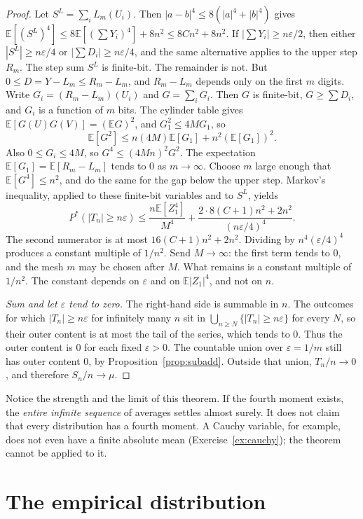 \begin{proof}
Let $S^L=\sum_i L_m(U_i)$. Then $|a-b|^4\le8(|a|^4+|b|^4)$ gives $\mathbb E[(S^L)^4]\le8\mathbb E[(\sum Y_i)^4]+8n^2\le8Cn^2+8n^2$. If $|\sum Y_i|\ge n\varepsilon/2$, then either $|S^L|\ge n\varepsilon/4$ or $|\sum D_i|\ge n\varepsilon/4$, and the same alternative applies to the upper step $R_m$. The step sum $S^L$ is finite-bit. The remainder is not. But $0\le D=Y-L_m\le R_m-L_m$, and $R_m-L_m$ depends only on the first $m$ digits. Write $G_i=(R_m-L_m)(U_i)$ and $G=\sum_i G_i$. Then $G$ is finite-bit, $G\ge\sum D_i$, and $G_i$ is a function of $m$ bits. The cylinder table gives $\mathbb E[G(U)G(V)]=(\mathbb E G)^2$, and $G_1^2\le 4M G_1$, so
\[
 \mathbb E[G^2]
 \le n(4M)\mathbb E[G_1]+n^2(\mathbb E[G_1])^2.
\]
Also $0\le G_i\le4M$, so $G^4\le(4Mn)^2 G^2$. The expectation $\mathbb E[G_1]=\mathbb E[R_m-L_m]$ tends to $0$ as $m\to\infty$. Choose $m$ large enough that $\mathbb E[G^4]\le n^2$, and do the same for the gap below the upper step. Markov's inequality, applied to these finite-bit variables and to $S^L$, yields
\[
 P^*(|T_n|\ge n\varepsilon)
 \le\frac{n\mathbb E[Z_1^4]}{M^4}
 +\frac{2\cdot8(C+1)n^2+2n^2}{(n\varepsilon/4)^4}.
\]
The second numerator is at most $16(C+1)n^2+2n^2$. Dividing by $n^4(\varepsilon/4)^4$ produces a constant multiple of $1/n^2$. Send $M\to\infty$: the first term tends to $0$, and the mesh $m$ may be chosen after $M$. What remains is a constant multiple of $1/n^2$. The constant depends on $\varepsilon$ and on $\mathbb E|Z_1|^4$, and not on $n$.

\emph{Sum and let $\varepsilon$ tend to zero.} The right-hand side is summable in $n$. The outcomes for which $|T_n|\ge n\varepsilon$ for infinitely many $n$ sit in $\bigcup_{n\ge N}\{|T_n|\ge n\varepsilon\}$ for every $N$, so their outer content is at most the tail of the series, which tends to $0$. Thus the outer content is $0$ for each fixed $\varepsilon>0$. The countable union over $\varepsilon=1/m$ still has outer content $0$, by Proposition~\ref{prop:subadd}. Outside that union, $T_n/n\to0$, and therefore $S_n/n\to\mu$.
\end{proof}

Notice the strength and the limit of this theorem. If the fourth moment exists, the \emph{entire infinite sequence} of averages settles almost surely. It does not claim that every distribution has a fourth moment. A Cauchy variable, for example, does not even have a finite absolute mean (Exercise~\ref{ex:cauchy}); the theorem cannot be applied to it.

\section{The empirical distribution}

